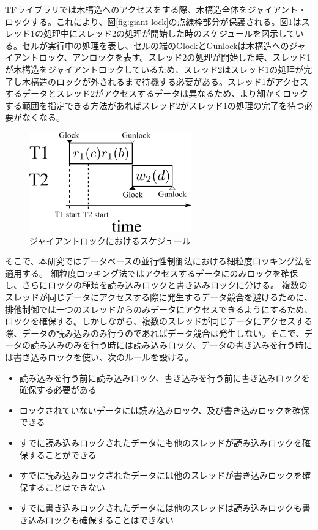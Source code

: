 \documentclass[a4paper]{jreport}	%
\begin{document}
TFライブラリでは木構造へのアクセスをする際、木構造全体をジャイアント・ロックする。これにより、図\ref{fig:giant-lock}の点線枠部分が保護される。図\ref{fig:g-lock-time}はスレッド1の処理中にスレッド2の処理が開始した時のスケジュールを図示している。セルが実行中の処理を表し、セルの端のGlockとGunlockは木構造へのジャイアントロック、アンロックを表す。スレッド2の処理が開始した時、スレッド1が木構造をジャイアントロックしているため、スレッド2はスレッド1の処理が完了し木構造のロックが外されるまで待機する必要がある。スレッド1がアクセスするデータとスレッド2がアクセスするデータは異なるため、より細かくロックする範囲を指定できる方法があればスレッド2がスレッド1の処理の完了を待つ必要がなくなる。


\begin{figure}[h] 
\centering
\includegraphics[width=7cm]{g-lock-time.png}	
\caption{ジャイアントロックにおけるスケジュール}
\label{fig:g-lock-time}
\end{figure}

そこで、本研究ではデータベースの並行性制御法における細粒度ロッキング法を適用する。
細粒度ロッキング法ではアクセスするデータにのみロックを確保し、さらにロックの種類を読み込みロックと書き込みロックに分ける。
複数のスレッドが同じデータにアクセスする際に発生するデータ競合を避けるために、排他制御では一つのスレッドからのみデータにアクセスできるようにするため、ロックを確保する。しかしながら、複数のスレッドが同じデータにアクセスする際、データの読み込みのみ行うのであればデータ競合は発生しない。そこで、データの読み込みのみを行う時には読み込みロック、データの書き込みを行う時には書き込みロックを使い、次のルールを設ける。

\begin{itemize}
 \item 読み込みを行う前に読み込みロック、書き込みを行う前に書き込みロックを確保する必要がある
 \item ロックされていないデータには読み込みロック、及び書き込みロックを確保できる
 \item すでに読み込みロックされたデータにも他のスレッドが読み込みロックを確保することができる
 \item すでに読み込みロックされたデータには他のスレッドが書き込みロックを確保することはできない
 \item すでに書き込みロックされたデータには他のスレッドは読み込みロックも書き込みロックも確保することはできない
\end{itemize}
\end{document}
